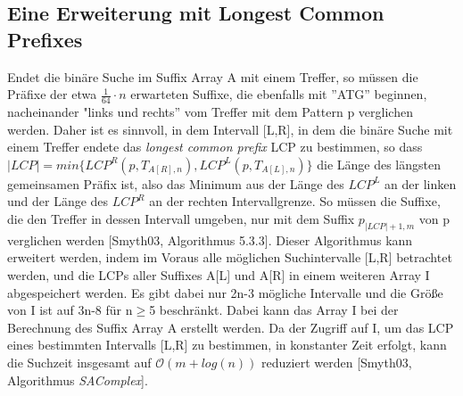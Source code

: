 \documentclass[12pt,twoside]{article}
\begin{document}
\subsection{Eine Erweiterung mit Longest Common Prefixes}
Endet die binäre Suche im Suffix Array A mit einem Treffer, so müssen die Präfixe der etwa $\frac{1}{64}\cdot n$ erwarteten Suffixe, die ebenfalls mit ''ATG'' beginnen, nacheinander "links und rechts'' vom Treffer mit dem Pattern p verglichen werden. Daher ist es sinnvoll, in dem Intervall [L,R], in dem die binäre Suche mit einem Treffer endete das \textit{longest common prefix} LCP zu bestimmen, so dass $\vert LCP \vert = min\{LCP^{R}(p,T_{A[R],n}), LCP^{L}(p,T_{A[L],n})\}$ die Länge des längsten gemeinsamen Präfix ist, also das Minimum aus der Länge des $LCP^{L}$ an der linken und der Länge des $LCP^{R}$ an der rechten Intervallgrenze. So müssen die Suffixe, die den Treffer in dessen Intervall umgeben, nur mit dem Suffix $p_{\vert LCP \vert+1, m}$ von p verglichen werden [Smyth03, Algorithmus 5.3.3]. Dieser Algorithmus kann erweitert werden, indem im Voraus alle möglichen Suchintervalle [L,R] betrachtet werden, und die LCPs aller Suffixes A[L] und A[R] in einem weiteren Array I abgespeichert werden. Es gibt dabei nur 2n-3 mögliche Intervalle und die Größe von I ist auf 3n-8 für n$\geq$5 beschränkt. Dabei kann das Array I bei der Berechnung des Suffix Array A erstellt werden. Da der Zugriff auf I, um das LCP eines bestimmten Intervalls [L,R] zu bestimmen, in konstanter Zeit erfolgt, kann die Suchzeit insgesamt auf $\mathcal{O}(m + log(n))$ reduziert werden [Smyth03, Algorithmus \textit{SAComplex}].
\end{document}
